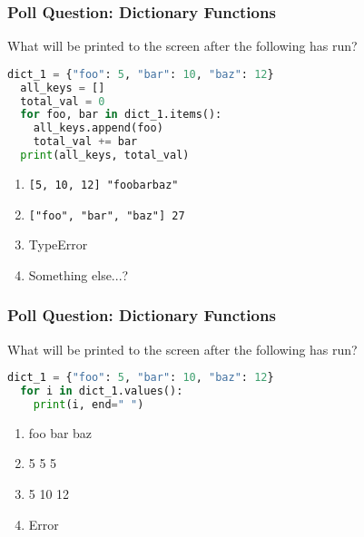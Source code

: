 \documentclass{beamer}
\begin{document}
%
%
\begin{frame}[fragile]
  \frametitle{Poll Question: Dictionary Functions}
  What will be printed to the screen after the following has run?
  \begin{lstlisting}[language=Python, autogobble]
  dict_1 = {"foo": 5, "bar": 10, "baz": 12}
  all_keys = []
  total_val = 0
  for foo, bar in dict_1.items():
    all_keys.append(foo)
    total_val += bar
  print(all_keys, total_val)
  \end{lstlisting}
  \vfill
  \begin{enumerate}[A]
    \item \lstinline|[5, 10, 12] "foobarbaz"|
    \item \lstinline|["foo", "bar", "baz"] 27|
    \item TypeError
    \item Something else...?
  \end{enumerate}
\end{frame}

%
%
\begin{frame}[fragile]
  \frametitle{Poll Question: Dictionary Functions}
  What will be printed to the screen after the following has run?
  \begin{lstlisting}[language=Python, autogobble]
  dict_1 = {"foo": 5, "bar": 10, "baz": 12}
  for i in dict_1.values():
    print(i, end=" ")
  \end{lstlisting}
  \vfill
  \begin{enumerate}[A]
    \item foo bar baz
    \item 5 5 5
    \item 5 10 12
    \item Error 
  \end{enumerate}
\end{frame}
\end{document}
